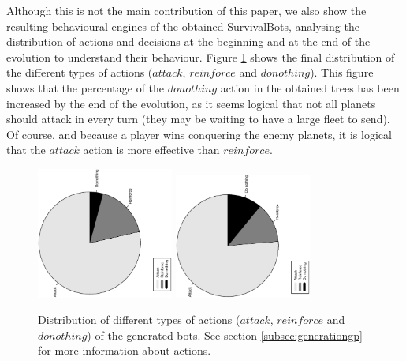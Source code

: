\documentclass[conference]{IEEEtran}
\begin{document}
Although this is not the main contribution of this paper, we also show the resulting behavioural engines of the obtained SurvivalBots, analysing the distribution of actions and decisions at the beginning and at the end of the evolution to understand their behaviour. Figure \ref{figura:tarta_actions} shows the final distribution of the different types of actions ($attack$, $reinforce$ and $do nothing$). This figure shows that %
 the percentage of the $do nothing$ action in the obtained trees has been increased %
by the end of the evolution, as it seems logical that not all planets should attack in every turn (they may be waiting to have a large fleet to send). Of course, and because a player wins conquering the enemy planets, it is logical that the $attack$ action is more effective than $reinforce$.

\begin{figure}[htb]
\tiny
\begin{center}


    \includegraphics[trim=1cm 7cm 1cm 5.8cm, clip=true,width=4.5cm,angle=-90]{./imags/distribution_initial_action.eps}
    \includegraphics[trim=1cm 7cm 1cm 6cm, clip=true,width=4.5cm,angle=-90]{./imags/distribution_final_action.eps}


\end{center}
\caption{Distribution of different types of actions ($attack$, $reinforce$ and $do nothing$) of the generated bots. See section \ref{subsec:generationgp} for more information about actions.}
\label{figura:tarta_actions}
\end{figure}
\end{document}
